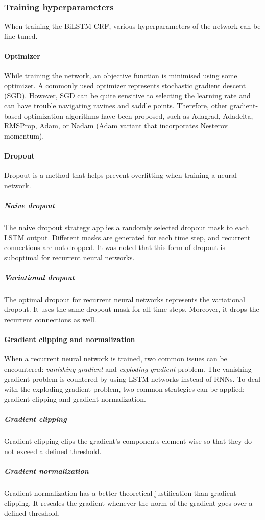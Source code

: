 \subsubsection{Training hyperparameters}
When training the BiLSTM-CRF, various hyperparameters of the network can be fine-tuned.

\paragraph{Optimizer}
While training the network, an objective function is minimised using some optimizer. A commonly used optimizer represents stochastic gradient descent (SGD). However, SGD can be quite sensitive to selecting the learning rate and can have trouble navigating ravines and saddle points. Therefore, other gradient-based optimization algorithms have been proposed, such as Adagrad, Adadelta, RMSProp, Adam, or Nadam (Adam variant that incorporates Nesterov momentum).~\cite{BiLSTMCRFHyperparameters}

\paragraph{Dropout}
Dropout is a method that helps prevent overfitting when training a neural network. 

\subparagraph{Naive dropout}
The naive dropout strategy applies a randomly selected dropout mask to each LSTM output. Different masks are generated for each time step, and recurrent connections are not dropped. It was noted that this form of dropout is suboptimal for recurrent neural networks.

\subparagraph{Variational dropout}
The optimal dropout for recurrent neural networks represents the variational dropout. It uses the same dropout mask for all time steps. Moreover, it drops the recurrent connections as well.~\cite{BiLSTMCRFHyperparameters}

\paragraph{Gradient clipping and normalization}
When a recurrent neural network is trained, two common issues can be encountered: \emph{vanishing gradient} and \emph{exploding gradient} problem. The vanishing gradient problem is countered by using LSTM networks instead of RNNs. To deal with the exploding gradient problem, two common strategies can be applied: gradient clipping and gradient normalization.

\subparagraph{Gradient clipping}
Gradient clipping clips the gradient's components element-wise so that they do not exceed a defined threshold.

\subparagraph{Gradient normalization}
Gradient normalization has a better theoretical justification than gradient clipping. It rescales the gradient whenever the norm of the gradient goes over a defined threshold.~\cite{BiLSTMCRFHyperparameters}
